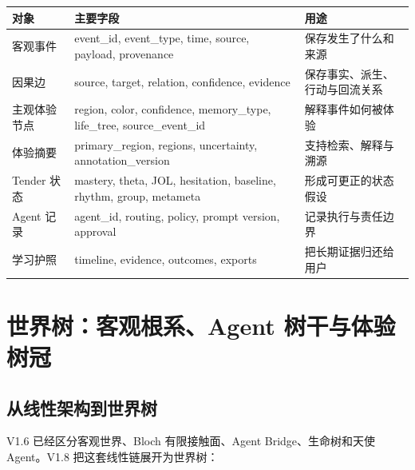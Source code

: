 \documentclass[UTF8,a4paper,11pt]{ctexart}
\begin{document}
\begin{center}
\begin{longtable}{@{}p{3.6cm}p{5.0cm}p{5.9cm}@{}}
\toprule
\textbf{对象} & \textbf{主要字段} & \textbf{用途} \\
\midrule
客观事件 & event\_id, event\_type, time, source, payload, provenance & 保存发生了什么和来源 \\
因果边 & source, target, relation, confidence, evidence & 保存事实、派生、行动与回流关系 \\
主观体验节点 & region, color, confidence, memory\_type, life\_tree, source\_event\_id & 解释事件如何被体验 \\
体验摘要 & primary\_region, regions, uncertainty, annotation\_version & 支持检索、解释与溯源 \\
Tender 状态 & mastery, theta, JOL, hesitation, baseline, rhythm, group, metameta & 形成可更正的状态假设 \\
Agent 记录 & agent\_id, routing, policy, prompt version, approval & 记录执行与责任边界 \\
学习护照 & timeline, evidence, outcomes, exports & 把长期证据归还给用户 \\
\bottomrule
\end{longtable}
\end{center}

\newpage
\section{世界树：客观根系、Agent 树干与体验树冠}

\subsection{从线性架构到世界树}

V1.6 已经区分客观世界、Bloch 有限接触面、Agent Bridge、生命树和天使 Agent。V1.8 把这套线性链展开为世界树：
\end{document}
